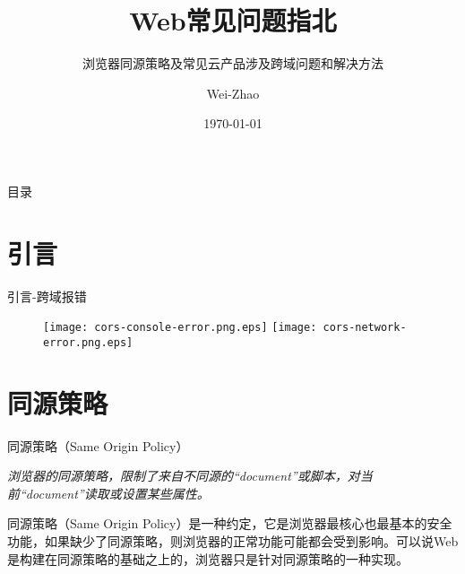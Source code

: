 \documentclass[aspectratio=169,xcolor=dvipsnames,UTF8]{beamer}
\title[Web常见问题指北]{Web常见问题指北}
\subtitle{浏览器同源策略及常见云产品涉及跨域问题和解决方法}
\author[Wei-Zhao] {Wei-Zhao}
\institute[Anchnet] 
{
    Anchen.Net
}
\date{\today}
\begin{document}
\begin{frame}
    \titlepage
\end{frame}


\begin{frame}{目录}
    \tableofcontents
\end{frame}



\section{引言}
\begin{frame}{引言-跨域报错}
    \begin{figure}
          \texttt{[image: cors-console-error.png.eps]}
          \texttt{[image: cors-network-error.png.eps]}
    \end{figure}
\end{frame}

\section{同源策略}
\begin{frame}{同源策略（Same Origin Policy）}
    \begin{block}{}
        \emph{浏览器的同源策略，限制了来自不同源的“document”或脚本，对当前“document”读取或设置某些属性。}
	\end{block}
	\vspace{2em}
    \setlength{\parindent}{2em}同源策略（Same Origin Policy）是一种约定，它是浏览器最核心也最基本的安全功能，如果缺少了同源策略，则浏览器的正常功能可能都会受到影响。可以说Web是构建在同源策略的基础之上的，浏览器只是针对同源策略的一种实现。
\end{frame}
\end{document}
